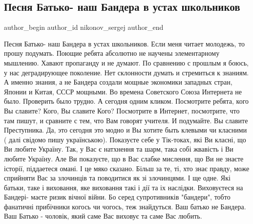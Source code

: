  
 
 
 
 
 
\subsection{Песня Батько- наш Бандера в устах школьников}
\label{sec:22_10_2021.fb.nikonov_sergej.2.pesnja_bandera}
 
\ifcmt
 author_begin
   author_id nikonov_sergej
 author_end
\fi

Песня Батько- наш Бандера в устах школьников. Если меня читает молодежь, то
прошу подумать. Поющие ребята абсолютно не научены элементарному мышлению.
Хавают пропаганду и не думают. По сравнению с прошлым я боюсь, у нас
деградирующее поколение. Нет склонности думать и стремиться к знаниям. А именно
знания, а не Бандера создали мощные экономики западных стран, Японии и Китая,
СССР мощными.  Во времена Советского Союза Интернета не было. Проверить было
трудно.  А сегодня одним кликом. Посмотрите ребята, кого Вы славите? Кого, Вы
славите Кого? Посмотрите в Интернет, посмотрите, что там пишут, и сравните с
тем, что Вам говорят учителя. И подумайте. Вы славите Преступника. Да, это
сегодня это модно и Вы хотите быть клевыми чи класними ( далі свідомо пишу
українською). Показуєте себе у Тік-токах, які Ви класні, що Ви любите Україну.
Так, у Вас є натхнення  та шарм, така собі жвавість і Ви любите Україну. Але Ви
показуєте, що в Вас слабке мислення, що Ви не знаєте історії, піддаетеся омані.
І це мяко сказано. Більш за те, ті, хто знає правду, може сприйняти Вас за
злочинців та поводитися як зі злочинцями.  І ще одне. Які батьки, таке і
виховання, яке виховання такі і дії та іх наслідки. Виховуєтеся на Бандері-
маєте ризик вічної війни. Бо серед супротивників "бандери", тобто фанатичні
прибічники когось чи чогось, теж знайдуться. Ваш батько не Бандера. Ваш Батько
- чоловік, який саме Вас виховує та саме Вас любить.

